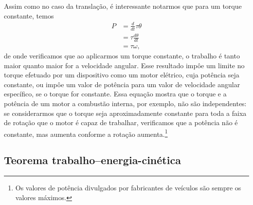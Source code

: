 Assim como no caso da translação, é interessante notarmos que para um torque constante, temos
\begin{align}
    P &= \frac{d}{dt} \tau \theta \\
    &= \tau \frac{d\theta}{dt} \\
    &= \tau \omega,
\end{align}
%
de onde verificamos que ao aplicarmos um torque constante, o trabalho é tanto maior quanto maior for a velocidade angular. Esse resultado impôe um limite no torque efetuado por um dispositivo como um motor elétrico, cuja potência seja constante, ou impôe um valor de potência para um valor de velocidade angular específico, se o torque for constante. Essa equação mostra que o torque e a potência de um motor a combustão interna, por exemplo, não são independentes: se considerarmos que o torque seja aproximadamente constante para toda a faixa de rotação que o motor é capaz de trabalhar, verificamos que a potência não é constante, mas aumenta conforme a rotação aumenta.\footnote{Os valores de potência divulgados por fabricantes de veículos são sempre os valores máximos.}



\subsection{Teorema trabalho--energia-cinética}

